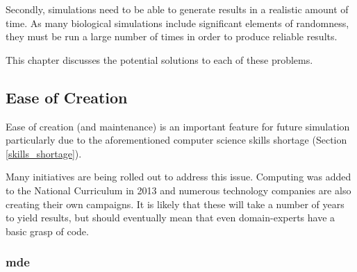\documentclass{UoYCSproject}
\begin{document}
Secondly, simulations need to be able to generate results in a realistic amount of time.
As many biological simulations include significant elements of randomness, they must be run a large number of times in order to produce reliable results.

This chapter discusses the potential solutions to each of these problems.

\subsection{Ease of Creation}
Ease of creation (and maintenance) is an important feature for future simulation particularly due to the aforementioned computer science skills shortage (Section \ref{skills_shortage}).



Many initiatives are being rolled out to address this issue.
Computing was added to the National Curriculum in 2013\cite{national_curriculum} and numerous technology companies are also creating their own campaigns\cite{apple_education, google_education}.
It is likely that these will take a number of years to yield results, but should eventually mean that even domain-experts have a basic grasp of code.





\subsubsection{\acrlong{mde}}
\end{document}
